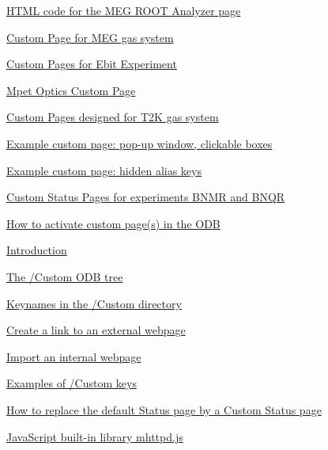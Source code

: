\begin{TabularC}{2}
\begin{TabularC}{2}
\begin{DoxyItemize}
\begin{DoxyItemize}
\begin{DoxyItemize}
\begin{DoxyItemize}
\begin{DoxyItemize}
\item \hyperlink{RC_MEG_ROOT_code}{HTML code for the MEG ROOT Analyzer page} 
\end{DoxyItemize}
\item \hyperlink{RC_MEG_Gas_Page}{Custom Page for MEG gas system} 
\item \hyperlink{RC_Ebit_custom_page}{Custom Pages for Ebit Experiment} 
\item \hyperlink{RC_Mpet_custom_page}{Mpet Optics Custom Page} 
\item \hyperlink{RC_T2K_Gas_Page}{Custom Pages designed for T2K gas system} 
\begin{DoxyItemize}
\item \hyperlink{RC_T2K_Gas_Page_T2K_example_1}{Example custom page: pop-\/up window, clickable boxes} 
\item \hyperlink{RC_T2K_Gas_Page_T2K_example_2}{Example custom page: hidden alias keys} 
\end{DoxyItemize}
\item \hyperlink{RC_BNMQR_status}{Custom Status Pages for experiments BNMR and BNQR} 
\item \hyperlink{RC_mhttpd_Activate}{How to activate custom page(s) in the ODB} 
\begin{DoxyItemize}
\item \hyperlink{RC_mhttpd_Activate_RC_odb_custom_intro}{Introduction} 
\item \hyperlink{RC_mhttpd_Activate_RC_odb_custom_tree}{The /Custom ODB tree} 
\begin{DoxyItemize}
\item \hyperlink{RC_mhttpd_Activate_RC_odb_custom_keynames}{Keynames in the /Custom directory} 
\item \hyperlink{RC_mhttpd_Activate_RC_odb_custom_external_example}{Create a link to an external webpage} 
\item \hyperlink{RC_mhttpd_Activate_RC_odb_custom_internal_example}{Import an internal webpage} 
\item \hyperlink{RC_mhttpd_Activate_RC_odb_custom_keys_examples}{Examples of /Custom keys} 
\end{DoxyItemize}
\item \hyperlink{RC_mhttpd_Activate_RC_odb_custom_status}{How to replace the default Status page by a Custom Status page} 
\end{DoxyItemize}
\item \hyperlink{RC_mhttpd_custom_js_lib}{JavaScript built-\/in library mhttpd.js} 

\end{DoxyItemize}
\end{DoxyItemize}
\end{DoxyItemize}
\end{DoxyItemize}
\end{TabularC}
\end{TabularC}
